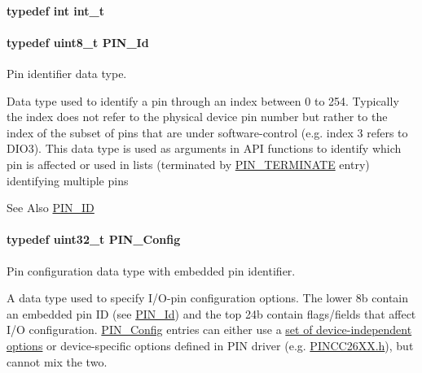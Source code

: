 \paragraph[{int\-\_\-t}]{\setlength{\rightskip}{0pt plus 5cm}typedef int {\bf int\-\_\-t}}\label{_p_i_n_8h_ab6fd6105e64ed14a0c9281326f05e623}
\paragraph[{P\-I\-N\-\_\-\-Id}]{\setlength{\rightskip}{0pt plus 5cm}typedef uint8\-\_\-t {\bf P\-I\-N\-\_\-\-Id}}\label{_p_i_n_8h_a9ae8197f460bb76ea09a84f47d09921f}


Pin identifier data type. 

Data type used to identify a pin through an index between 0 to 254. Typically the index does not refer to the physical device pin number but rather to the index of the subset of pins that are under software-\/control (e.\-g. index 3 refers to D\-I\-O3). This data type is used as arguments in A\-P\-I functions to identify which pin is affected or used in lists (terminated by \hyperlink{_p_i_n_8h_ae22ec44ad92ee130a665ca56aad38c75}{P\-I\-N\-\_\-\-T\-E\-R\-M\-I\-N\-A\-T\-E} entry) identifying multiple pins \begin{DoxySeeAlso}{See Also}
\hyperlink{_p_i_n_8h_add47c82f7563d28053f76d368d344bc6}{P\-I\-N\-\_\-\-I\-D} 
\end{DoxySeeAlso}
\paragraph[{P\-I\-N\-\_\-\-Config}]{\setlength{\rightskip}{0pt plus 5cm}typedef uint32\-\_\-t {\bf P\-I\-N\-\_\-\-Config}}\label{_p_i_n_8h_ae427b7d2925f9b0f3145e455cfdb5841}


Pin configuration data type with embedded pin identifier. 

A data type used to specify I/\-O-\/pin configuration options. The lower 8b contain an embedded pin I\-D (see \hyperlink{_p_i_n_8h_a9ae8197f460bb76ea09a84f47d09921f}{P\-I\-N\-\_\-\-Id}) and the top 24b contain flags/fields that affect I/\-O configuration. \hyperlink{_p_i_n_8h_ae427b7d2925f9b0f3145e455cfdb5841}{P\-I\-N\-\_\-\-Config} entries can either use a \hyperlink{_p_i_n_8h_PIN_GENERIC_FLAGS}{set of device-\/independent options} or device-\/specific options defined in P\-I\-N driver (e.\-g. \hyperlink{_p_i_n_c_c26_x_x_8h}{P\-I\-N\-C\-C26\-X\-X.\-h}), but cannot mix the two.

